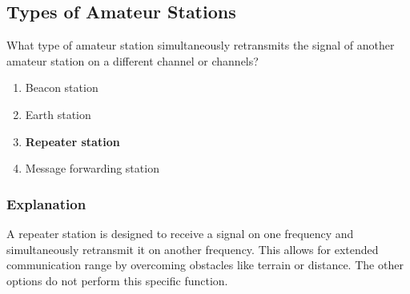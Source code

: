 \subsection{Types of Amateur Stations}
\label{T1F09}

\begin{tcolorbox}[colback=gray!10!white,colframe=black!75!black,title=T1F09]
What type of amateur station simultaneously retransmits the signal of another amateur station on a different channel or channels?
\begin{enumerate}[label=\Alph*),noitemsep]
    \item Beacon station
    \item Earth station
    \item \textbf{Repeater station}
    \item Message forwarding station
\end{enumerate}
\end{tcolorbox}

\subsubsection*{Explanation}
A repeater station is designed to receive a signal on one frequency and simultaneously retransmit it on another frequency. This allows for extended communication range by overcoming obstacles like terrain or distance. The other options do not perform this specific function.